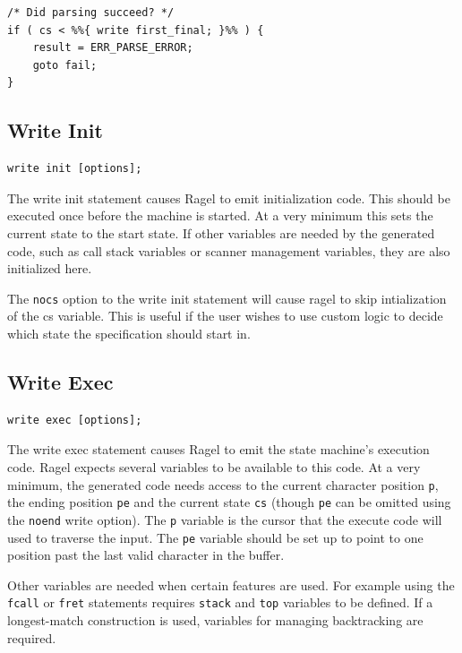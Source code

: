 \documentclass[letterpaper,11pt,oneside]{book}
\newcommand{\verbspace}{\vspace{10pt}}
\begin{document}
\verbspace

{
\small
\begin{verbatim}
/* Did parsing succeed? */
if ( cs < %%{ write first_final; }%% ) {
    result = ERR_PARSE_ERROR;
    goto fail;
}
\end{verbatim}
}
  

\subsection{Write Init}
\begin{verbatim}
write init [options];
\end{verbatim}
\verbspace

The write init statement causes Ragel to emit initialization code. This should
be executed once before the machine is started. At a very minimum this sets the
current state to the start state. If other variables are needed by the
generated code, such as call stack variables or scanner management
variables, they are also initialized here.

The \verb|nocs| option to the write init statement will cause ragel to skip
intialization of the cs variable. This is useful if the user wishes to use
custom logic to decide which state the specification should start in.

\subsection{Write Exec}
\begin{verbatim}
write exec [options];
\end{verbatim}
\verbspace

The write exec statement causes Ragel to emit the state machine's execution code.
Ragel expects several variables to be available to this code. At a very minimum, the
generated code needs access to the current character position \verb|p|, the ending
position \verb|pe| and the current state \verb|cs| (though \verb|pe|
can be omitted using the \verb|noend| write option).
The \verb|p| variable is the cursor that the execute code will
used to traverse the input. The \verb|pe| variable should be set up to point to one
position past the last valid character in the buffer.

Other variables are needed when certain features are used. For example using
the \verb|fcall| or \verb|fret| statements requires \verb|stack| and
\verb|top| variables to be defined. If a longest-match construction is used,
variables for managing backtracking are required.
\end{document}
